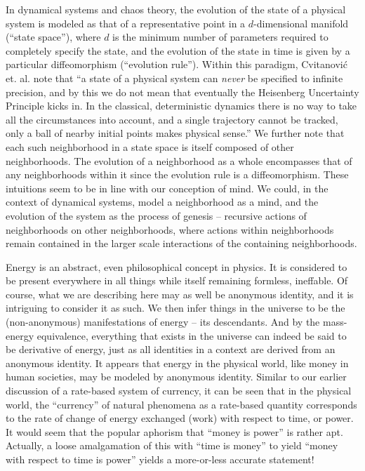 \documentclass[pra,twocolumn,groupedaddress,10pt]{revtex4}
\theoremstyle{definition}
\begin{document}
In dynamical systems and chaos theory, the evolution of the state of a physical system is modeled as that of a representative point in a $d$-dimensional manifold (``state space''), where $d$ is the minimum number of parameters required to completely specify the state, and the evolution of the state in time is given by a particular diffeomorphism (``evolution rule''). Within this paradigm, Cvitanovi\'{c} et. al.\cite{chaosbook} note that ``a state of a physical system can \textit{never} be specified to infinite precision, and by this we do not mean that eventually the Heisenberg Uncertainty Principle kicks in. In the classical, deterministic dynamics there is no way to take all the circumstances into account, and a single trajectory cannot be tracked, only a ball of nearby initial points makes physical sense.'' We further note that each such neighborhood in a state space is itself composed of other neighborhoods. The evolution of a neighborhood as a whole encompasses that of any neighborhoods within it since the evolution rule is a diffeomorphism. These intuitions seem to be in line with our conception of mind. We could, in the context of dynamical systems, model a neighborhood as a mind, and the evolution of the system as the process of genesis -- recursive actions of neighborhoods on other neighborhoods, where actions within neighborhoods remain contained in the larger scale interactions of the containing neighborhoods.

Energy is an abstract, even philosophical concept in physics. It is considered to be present everywhere in all things while itself remaining formless, ineffable. Of course, what we are describing here may as well be anonymous identity, and it is intriguing to consider it as such. We then infer things in the universe to be the (non-anonymous) manifestations of energy -- its descendants. And by the mass-energy equivalence, everything that exists in the universe can indeed be said to be derivative of energy, just as all identities in a context are derived from an anonymous identity. It appears that energy in the physical world, like money in human societies, may be modeled by anonymous identity. Similar to our earlier discussion of a rate-based system of currency, it can be seen that in the physical world, the ``currency'' of natural phenomena as a rate-based quantity corresponds to the rate of change of energy exchanged (work) with respect to time, or power. It would seem that the popular aphorism that ``money is power'' is rather apt. Actually, a loose amalgamation of this with ``time is money'' to yield ``money with respect to time is power'' yields a more-or-less accurate statement!
\end{document}
